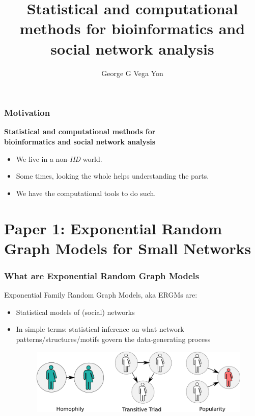 \documentclass[aspectratio=169, 9pt, handout]{beamer}\usepackage[]{graphicx}\usepackage[]{color}
\title[Stat. Comp. Bioinf \& SocNets.]{Statistical and computational methods for bioinformatics and social network analysis\linebreak{\small or how did I learn to stop worrying and love the bomb}}
\author[GGVY]{George G Vega Yon}
\institute[USC-PREVMED]{University of Southern California, Department of Preventive Medicine}
\def\cursection{\frame{\frametitle{Contents}\tableofcontents[current]}}
\begin{document}

\begin{frame}[noframenumbering]
\maketitle
\end{frame}

\begin{frame}
\frametitle{Motivation}

\begin{center}
\large
\textcolor{usccardinal}{\bf Statistical and computational methods for\\ %
bioinformatics and social network analysis}
\end{center}

\begin{itemize}
\item We live in a non-{\it IID} world.
\item Some times, looking the whole helps understanding the parts.
\item We have the computational tools to do such.
\end{itemize}
\end{frame}

\section{Paper 1: Exponential Random Graph Models for Small Networks}
\cursection


\begin{frame}
\frametitle{What are Exponential Random Graph Models}

Exponential Family Random Graph Models, aka \alert{ERGMs} are:\pause

\begin{itemize}[<+->]
\item Statistical models of (social) networks
\item In simple terms: statistical inference on what network patterns/structures/motifs
govern the data-generating process
\begin{figure}
\includegraphics[width=.6\linewidth]{friendly-terms.pdf}
\end{figure}
\end{itemize}

\end{frame}
\end{document}
